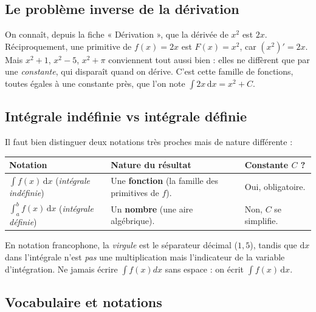 \documentclass[11pt,a4paper]{article}
\newcommand{\dd}{\mathrm{d}}
\begin{document}
\subsection{Le problème inverse de la dérivation}

On connaît, depuis la fiche « Dérivation », que la dérivée de $x^2$ est $2x$. Réciproquement,
une primitive de $f(x)=2x$ est $F(x)=x^2$, car $(x^2)'=2x$. Mais $x^2+1$, $x^2-5$,
$x^2+\pi$ conviennent tout aussi bien : elles ne diffèrent que par une \emph{constante}, qui
disparaît quand on dérive. C'est cette famille de fonctions, toutes égales à une constante près,
que l'on note $\int 2x\,\dd x = x^2+C$.

\subsection{Intégrale indéfinie vs intégrale définie}

Il faut bien distinguer deux notations très proches mais de nature différente :

\begin{center}
\renewcommand{\arraystretch}{1.45}
\begin{tabular}{>{\raggedright\arraybackslash}p{4.6cm} >{\raggedright\arraybackslash}p{5.2cm} >{\raggedright\arraybackslash}p{4.4cm}}
\rowcolor{primary!18}
\textbf{Notation} & \textbf{Nature du résultat} & \textbf{Constante $C$ ?}\\
\midrule
$\displaystyle\int f(x)\,\dd x$ \newline (\emph{intégrale indéfinie}) & Une \textbf{fonction} (la famille des primitives de $f$). & Oui, obligatoire.\\
$\displaystyle\int_a^b f(x)\,\dd x$ \newline (\emph{intégrale définie}) & Un \textbf{nombre} (une aire algébrique). & Non, $C$ se simplifie.\\
\bottomrule
\end{tabular}
\end{center}

\begin{remarque}
En notation francophone, la \emph{virgule} est le séparateur décimal ($1{,}5$), tandis que
$\dd x$ dans l'intégrale n'est \emph{pas} une multiplication mais l'indicateur de la variable
d'intégration. Ne jamais écrire $\int f(x)dx$ sans espace : on écrit $\int f(x)\,\dd x$.
\end{remarque}

\subsection{Vocabulaire et notations}
\end{document}
